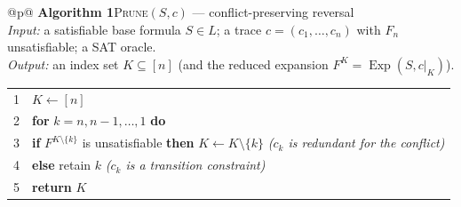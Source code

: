 \documentclass[11pt,reqno]{amsart}
\makeatletter
\theoremstyle{plain}
\theoremstyle{definition}
\DeclareMathOperator{\Exp}{Exp}
\newcommand{\PRUNE}{\textsc{Prune}}
\newenvironment{algobox}[1]
  {\par\medskip\noindent\begin{tabular}{@{}p{\dimexpr\linewidth-2\tabcolsep}@{}}
   \toprule \textbf{Algorithm 1}\quad #1\\ \midrule}
  {\\ \bottomrule\end{tabular}\par\medskip}
\makeatother
\begin{document}
\begin{algobox}{\PRUNE$(S,c)$ --- conflict-preserving reversal}
\emph{Input:} a satisfiable base formula $S\in L$; a trace $c=(c_1,\dots,c_n)$ with
$F_n$ unsatisfiable; a SAT oracle.\\[2pt]
\emph{Output:} an index set $K\subseteq[n]$ (and the reduced expansion
$F^K=\Exp(S,c|_K)$).\\[4pt]
\begin{tabular}{@{}r@{\quad}l@{}}
1 & $K\leftarrow[n]$\\
2 & \textbf{for} $k=n,n-1,\dots,1$ \textbf{do}\\
3 & \quad \textbf{if} $F^{K\setminus\{k\}}$ is unsatisfiable \textbf{then} $K\leftarrow K\setminus\{k\}$ \quad\textit{($c_k$ is redundant for the conflict)}\\
4 & \quad \textbf{else} retain $k$ \quad\textit{($c_k$ is a transition constraint)}\\
5 & \textbf{return} $K$\\
\end{tabular}
\end{algobox}
\end{document}

